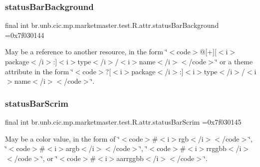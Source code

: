 \subsubsection{\texorpdfstring{status\+Bar\+Background}{statusBarBackground}}
{\footnotesize\ttfamily final int br.\+unb.\+cic.\+mp.\+marketmaster.\+test.\+R.\+attr.\+status\+Bar\+Background =0x7f030144\hspace{0.3cm}{\ttfamily [static]}}

May be a reference to another resource, in the form \char`\"{}$<$code$>$@\mbox{[}+\mbox{]}\mbox{[}$<$i$>$package$<$/i$>$\+:\mbox{]}$<$i$>$type$<$/i$>$/$<$i$>$name$<$/i$>$$<$/code$>$\char`\"{} or a theme attribute in the form \char`\"{}$<$code$>$?\mbox{[}$<$i$>$package$<$/i$>$\+:\mbox{]}$<$i$>$type$<$/i$>$/$<$i$>$name$<$/i$>$$<$/code$>$\char`\"{}. \mbox{\label{classbr_1_1unb_1_1cic_1_1mp_1_1marketmaster_1_1test_1_1R_1_1attr_aae619a4f76e6376ef6d312195975306b}} 
\subsubsection{\texorpdfstring{status\+Bar\+Scrim}{statusBarScrim}}
{\footnotesize\ttfamily final int br.\+unb.\+cic.\+mp.\+marketmaster.\+test.\+R.\+attr.\+status\+Bar\+Scrim =0x7f030145\hspace{0.3cm}{\ttfamily [static]}}

May be a color value, in the form of \char`\"{}$<$code$>$\#$<$i$>$rgb$<$/i$>$$<$/code$>$\char`\"{}, \char`\"{}$<$code$>$\#$<$i$>$argb$<$/i$>$$<$/code$>$\char`\"{}, \char`\"{}$<$code$>$\#$<$i$>$rrggbb$<$/i$>$$<$/code$>$\char`\"{}, or \char`\"{}$<$code$>$\#$<$i$>$aarrggbb$<$/i$>$$<$/code$>$\char`\"{}. \mbox{\label{classbr_1_1unb_1_1cic_1_1mp_1_1marketmaster_1_1test_1_1R_1_1attr_a139df64f92743529fc1bfcd876fed695}} 
